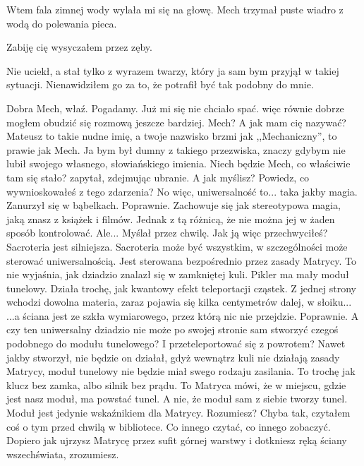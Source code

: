 Wtem fala zimnej wody wylała mi się na głowę. 
Mech trzymał puste wiadro z wodą do polewania pieca.
\begin{dialogue}
\ds{} Zabiję cię \dm{} wysyczałem przez zęby.
\end{dialogue}
Nie uciekł, a stał tylko z wyrazem twarzy, który ja sam bym przyjął w takiej sytuacji.
Nienawidziłem go za to, że potrafił być tak podobny do mnie.
\begin{dialogue}
\ds{} Dobra Mech, właź. Pogadamy. \dm{} Już mi się nie chciało spać. więc równie dobrze mogłem obudzić się rozmową jeszcze bardziej.
\ds{} Mech?
\ds{} A jak mam cię nazywać? Mateusz to takie nudne imię, a twoje nazwisko brzmi jak ,,Mechaniczny'', to prawie jak Mech. 
Ja bym był dumny z takiego przezwiska, znaczy gdybym nie lubił swojego własnego, słowiańskiego imienia.
\ds{} Niech będzie Mech, co właściwie tam się stało? \dm{} zapytał, zdejmując ubranie.
\ds{} A jak myślisz? Powiedz, co wywnioskowałeś z tego zdarzenia?
\ds{} No więc, uniwersalność to... taka jakby magia. \dm{} Zanurzył się w bąbelkach.
\ds{} Poprawnie. Zachowuje się jak stereotypowa magia, jaką znasz z książek i filmów. Jednak z tą różnicą, że nie można jej w żaden sposób kontrolować.
\ds{} Ale... \dm{} Myślał przez chwilę. \dm{} Jak ją więc przechwyciłeś?
\ds{} Sacroteria jest silniejsza. Sacroteria może być wszystkim, w szczególności może sterować uniwersalnością. Jest sterowana bezpośrednio przez zasady Matrycy.
\ds{} To nie wyjaśnia, jak dziadzio znalazł się w zamkniętej kuli.
\ds{} Pikler ma mały moduł tunelowy. Działa trochę, jak kwantowy efekt teleportacji cząstek. Z jednej strony wchodzi dowolna materia, zaraz pojawia się kilka centymetrów dalej, w słoiku...
\ds{} ...a ściana jest ze szkła wymiarowego, przez którą nic nie przejdzie.
\ds{} Poprawnie.
\ds{} A czy ten uniwersalny dziadzio nie może po swojej stronie sam stworzyć czegoś podobnego do modułu tunelowego? I przeteleportować się z powrotem?
\ds{} Nawet jakby stworzył, nie będzie on działał, gdyż wewnątrz kuli nie działają zasady Matrycy, moduł tunelowy nie będzie miał swego rodzaju zasilania.
To trochę jak klucz bez zamka, albo silnik bez prądu. 
To Matryca mówi, że w miejscu, gdzie jest nasz moduł, ma powstać tunel. A nie, że moduł sam z siebie tworzy tunel. Moduł jest jedynie wskaźnikiem dla Matrycy. Rozumiesz?
\ds{} Chyba tak, czytałem coś o tym przed chwilą w bibliotece.
\ds{} Co innego czytać, co innego zobaczyć. Dopiero jak ujrzysz Matrycę przez sufit górnej warstwy i dotkniesz ręką ściany wszechświata, zrozumiesz.
\end{dialogue}

